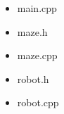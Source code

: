 \documentclass[11pt, a4paper]{article}
\begin{document}
    \begin{itemize}
        \item main.cpp
            
        \newpage
        \item maze.h
            
        \item maze.cpp
            
        \item robot.h
            
        \newpage
        \item robot.cpp
            
    \end{itemize}
\end{document}
